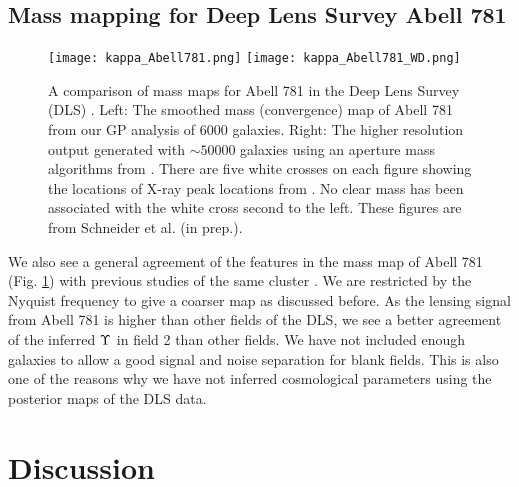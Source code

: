 \subsection{Mass mapping for Deep Lens Survey Abell 781}
\begin{figure}[h!]
	\centering
	\texttt{[image: kappa\_Abell781.png]}
	\texttt{[image: kappa\_Abell781\_WD.png]}
	\caption{A comparison of mass maps for Abell 781 in the Deep Lens Survey (DLS) 
		\label{fig:Abell781_massmap}.  Left: The smoothed mass (convergence) map of Abell 781 from 
		our GP analysis of 6000 galaxies.
		Right: The higher resolution output generated with $\sim 50000$ galaxies using an aperture
		mass algorithms from \cite{Wittman2014}. 
		There are five white crosses on each figure showing the locations of X-ray
		peak locations from \cite{Sehgal2008}. No clear mass has been associated
		with the white cross second to the left. 
	These figures are from Schneider et al. (in prep.).
}
\end{figure}
We also see a general agreement of the features in the mass map of Abell 781
(Fig. \ref{fig:Abell781_massmap}) with previous studies of the same cluster 
\cite{Wittman2014}.  
We are restricted by the Nyquist frequency to give a coarser map as discussed
before.   
As the lensing signal from Abell 781 is higher than other fields of the
DLS, we see a better agreement of the inferred $\Upsilon$ in field 2 than
other fields. We have not included enough galaxies to allow a good signal and
noise separation for blank fields. 
This is also one of the reasons why  we
 have not inferred cosmological parameters using the
posterior maps of the DLS data.



\section{Discussion}

